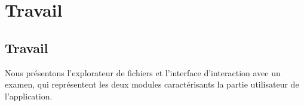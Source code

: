 \chapter{Travail}
\minitoc

\section{Travail}
Nous présentons l'explorateur de fichiers et l'interface d'interaction avec un examen, qui représentent les deux modules caractérisants la partie utilisateur de l'application.


%